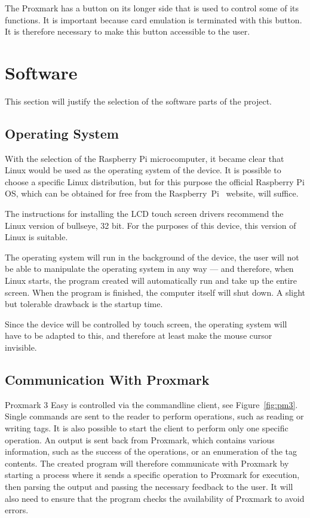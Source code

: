The Proxmark has a button on its longer side that is used to control some of its functions. It is important because card emulation is terminated with this button. It is therefore necessary to make this button accessible to the user.


\section{Software}

This section will justify the selection of the software parts of the project.

\subsection{Operating System}

With the selection of the Raspberry Pi microcomputer, it became clear that Linux would be used as the operating system of the device. It is possible to choose a specific Linux distribution, but for this purpose the official Raspberry Pi OS, which can be obtained for free from the Raspberry~Pi~\cite{raspberrypios} website, will suffice.

The instructions for installing the LCD touch screen drivers recommend the Linux version of bullseye, 32 bit. For the purposes of this device, this version of Linux is suitable.~\cite{waveshare35inch}

The operating system will run in the background of the device, the user will not be able to manipulate the operating system in any way --- and therefore, when Linux starts, the program created will automatically run and take up the entire screen. When the program is finished, the computer itself will shut down. A slight but tolerable drawback is the startup time.

Since the device will be controlled by touch screen, the operating system will have to be adapted to this, and therefore at least make the mouse cursor invisible.

\subsection{Communication With Proxmark}
\label{subsec:communication}

Proxmark 3 Easy is controlled via the commandline client, see Figure~\ref{fig:pm3}. Single commands are sent to the reader to perform operations, such as reading or writing tags. It is also possible to start the client to perform only one specific operation. An output is sent back from Proxmark, which contains various information, such as the success of the operations, or an enumeration of the tag contents. The created program will therefore communicate with Proxmark by starting a process where it sends a specific operation to Proxmark for execution, then parsing the output and passing the necessary feedback to the user. It will also need to ensure that the program checks the availability of Proxmark to avoid errors.

